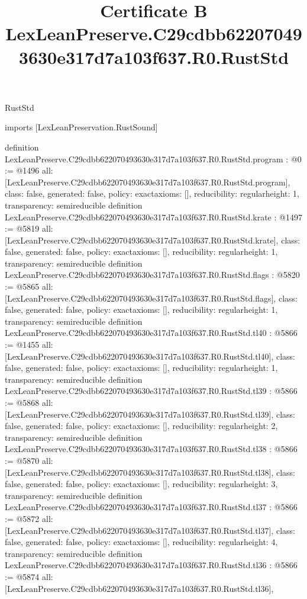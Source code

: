 \begin{lexlean}{RustStd}
\title{Certificate B LexLeanPreserve.C29cdbb622070493630e317d7a103f637.R0.RustStd}
\begin{coremodule}
imports [LexLeanPreservation.RustSound]

definition LexLeanPreserve.C29cdbb622070493630e317d7a103f637.R0.RustStd.program : @0 := @1496 {
  all: [LexLeanPreserve.C29cdbb622070493630e317d7a103f637.R0.RustStd.program],
  class: false,
  generated: false,
  policy: exact{axioms: []},
  reducibility: regular{height: 1},
  transparency: semireducible
}
definition LexLeanPreserve.C29cdbb622070493630e317d7a103f637.R0.RustStd.krate : @1497 := @5819 {
  all: [LexLeanPreserve.C29cdbb622070493630e317d7a103f637.R0.RustStd.krate],
  class: false,
  generated: false,
  policy: exact{axioms: []},
  reducibility: regular{height: 1},
  transparency: semireducible
}
definition LexLeanPreserve.C29cdbb622070493630e317d7a103f637.R0.RustStd.flags : @5820 := @5865 {
  all: [LexLeanPreserve.C29cdbb622070493630e317d7a103f637.R0.RustStd.flags],
  class: false,
  generated: false,
  policy: exact{axioms: []},
  reducibility: regular{height: 1},
  transparency: semireducible
}
definition LexLeanPreserve.C29cdbb622070493630e317d7a103f637.R0.RustStd.tl40 : @5866 := @1455 {
  all: [LexLeanPreserve.C29cdbb622070493630e317d7a103f637.R0.RustStd.tl40],
  class: false,
  generated: false,
  policy: exact{axioms: []},
  reducibility: regular{height: 1},
  transparency: semireducible
}
definition LexLeanPreserve.C29cdbb622070493630e317d7a103f637.R0.RustStd.tl39 : @5866 := @5868 {
  all: [LexLeanPreserve.C29cdbb622070493630e317d7a103f637.R0.RustStd.tl39],
  class: false,
  generated: false,
  policy: exact{axioms: []},
  reducibility: regular{height: 2},
  transparency: semireducible
}
definition LexLeanPreserve.C29cdbb622070493630e317d7a103f637.R0.RustStd.tl38 : @5866 := @5870 {
  all: [LexLeanPreserve.C29cdbb622070493630e317d7a103f637.R0.RustStd.tl38],
  class: false,
  generated: false,
  policy: exact{axioms: []},
  reducibility: regular{height: 3},
  transparency: semireducible
}
definition LexLeanPreserve.C29cdbb622070493630e317d7a103f637.R0.RustStd.tl37 : @5866 := @5872 {
  all: [LexLeanPreserve.C29cdbb622070493630e317d7a103f637.R0.RustStd.tl37],
  class: false,
  generated: false,
  policy: exact{axioms: []},
  reducibility: regular{height: 4},
  transparency: semireducible
}
definition LexLeanPreserve.C29cdbb622070493630e317d7a103f637.R0.RustStd.tl36 : @5866 := @5874 {
  all: [LexLeanPreserve.C29cdbb622070493630e317d7a103f637.R0.RustStd.tl36],
}
\end{coremodule}
\end{lexlean}
